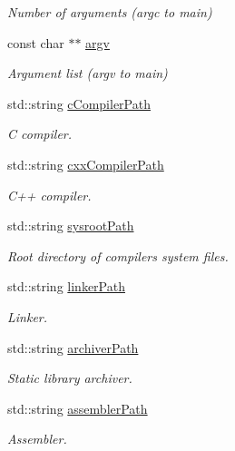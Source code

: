 \begin{DoxyCompactItemize}
\begin{DoxyCompactList}\small\item\em Number of arguments (argc to main) \end{DoxyCompactList}\item 
const char $\ast$$\ast$ \hyperlink{structmk_1_1_build_params__t_ab24c737327bc8f3e4ea465894071444d}{argv}
\begin{DoxyCompactList}\small\item\em Argument list (argv to main) \end{DoxyCompactList}\item 
std\+::string \hyperlink{structmk_1_1_build_params__t_a37af652ccbc4cd2c32d8b23e60bb40c8}{c\+Compiler\+Path}
\begin{DoxyCompactList}\small\item\em C compiler. \end{DoxyCompactList}\item 
std\+::string \hyperlink{structmk_1_1_build_params__t_ade3d92fa9276c4ac12fb1a5709e2982a}{cxx\+Compiler\+Path}
\begin{DoxyCompactList}\small\item\em C++ compiler. \end{DoxyCompactList}\item 
std\+::string \hyperlink{structmk_1_1_build_params__t_aa6b880797125853252b8336ffb47e35e}{sysroot\+Path}
\begin{DoxyCompactList}\small\item\em Root directory of compiler\textquotesingle{}s system files. \end{DoxyCompactList}\item 
std\+::string \hyperlink{structmk_1_1_build_params__t_a979d017b0fce3727dce2238bec4460df}{linker\+Path}
\begin{DoxyCompactList}\small\item\em Linker. \end{DoxyCompactList}\item 
std\+::string \hyperlink{structmk_1_1_build_params__t_a727eb93fac4297e3f8f2084455cb609e}{archiver\+Path}
\begin{DoxyCompactList}\small\item\em Static library archiver. \end{DoxyCompactList}\item 
std\+::string \hyperlink{structmk_1_1_build_params__t_a93732a76fa05d90f7749273eb200f67c}{assembler\+Path}
\begin{DoxyCompactList}\small\item\em Assembler. \end{DoxyCompactList}\item 
$$
\end{DoxyCompactItemize}
